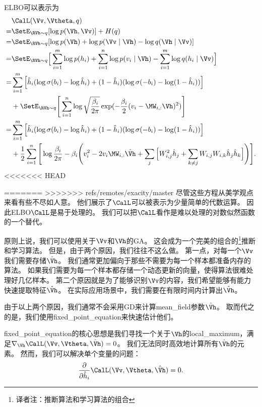 \gls{ELBO}可以表示为
\begin{align}
& \CalL(\Vv,\Vtheta,q)\\
 = & \SetE_{\RVh\sim q}[\log p(\Vh,\Vv)] + H(q)\\
 = & \SetE_{\RVh\sim q}[\log p(\Vh) + \log p(\Vv\mid\Vh) - \log q(\Vh\mid\Vv)]\\
= & \SetE_{\RVh\sim q}\Big[\sum_{i=1}^{m}\log p(h_i) + \sum_{i=1}^{n} \log p(v_i\mid\Vh) - \sum_{i=1}^{m}\log q(h_i\mid\Vv)\Big]\\
= &  \sum_{i=1}^{m}\Big[\hat{h}_i(\log \sigma(b_i) - \log \hat{h}_i) + (1 - \hat{h}_i)(\log \sigma(-b_i) - \log (1-\hat{h}_i))\Big] \\
& +  \SetE_{\RVh\sim q} \Bigg[ \sum_{i=1}^{n}\log \sqrt{\frac{\beta_i}{2\pi}}\exp(-\frac{\beta_i}{2}(v_i - \MW_{i,:}\Vh)^2)\Bigg] \\
= &  \sum_{i=1}^{m}\Big[\hat{h}_i(\log \sigma(b_i) - \log \hat{h}_i) + (1 - \hat{h}_i)(\log \sigma(-b_i) - \log (1-\hat{h}_i))\Big] \\
& + \frac{1}{2} \sum_{i=1}^{n} \Bigg[ \log {\frac{\beta_i}{2\pi}} - \beta_i \Bigg(v_i^2 - 2 v_i \MW_{i,:}\hat{\Vh} + \sum_{j}\Big[W^2_{i,j}\hat{h}_j + \sum_{k \neq j}W_{i,j}W_{i,k}\hat{h}_j\hat{h}_k \Big] \Bigg) \Bigg]. 
\label{eqn:1936}
\end{align}
<<<<<<< HEAD


=======
>>>>>>> refs/remotes/exacity/master
尽管这些方程从美学观点来看有些不尽如人意。
他们展示了$\CalL$可以被表示为少量简单的代数运算。
因此\gls{ELBO}$\CalL$是易于处理的。
我们可以把$\CalL$看作是难以处理的对数似然函数的一个替代。


原则上说，我们可以使用关于$\Vv$和$\Vh$的\gls{GA}。
这会成为一个完美的组合的\footnote{译者注：推断算法和学习算法的组合}推断和学习算法。
但是，由于两个原因，我们往往不这么做。
第一点，对每一个$\Vv$我们需要存储$\hat{\Vh}$。
我们通常更加偏向于那些不需要为每一个样本都准备内存的算法。
如果我们需要为每一个样本都存储一个动态更新的向量，使得算法很难处理好几亿样本。
第二个原因就是为了能够识别$\Vv$的内容，我们希望能够有能力快速提取特征$\hat{\Vh}$。
在实际应用场景中，我们需要在有限时间内计算出$\hat{\Vh}$。


由于以上两个原因，我们通常不会采用\gls{GD}来计算\gls{mean_field}参数$\hat{\Vh}$。
取而代之的是，我们使用\gls{fixed_point_equation}来快速估计他们。


\gls{fixed_point_equation}的核心思想是我们寻找一个关于$\Vh$的\gls{local_maximum}，满足$\nabla_{\Vh}\CalL(\Vv,\Vtheta,\hat{\Vh}) = 0$。
我们无法同时高效地计算所有$\hat{\Vh}$的元素。
然而，我们可以解决单个变量的问题：
\begin{align}
\label{eqn:1937}
\frac{\partial}{\partial \hat{h}_i} \CalL(\Vv,\Vtheta,\hat{\Vh}) = 0 .
\end{align}


